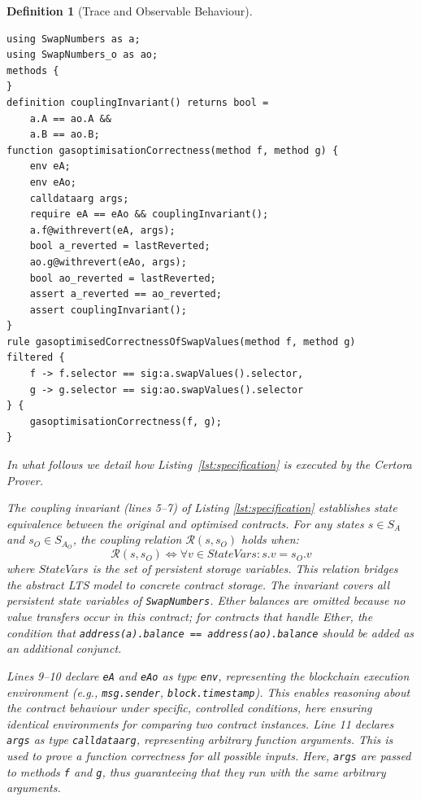 \documentclass[manuscript,screen,review]{acmart}
\newtheorem{definition}{Definition}
\begin{document}
\begin{definition}[Trace and Observable Behaviour]
\begin{listing}[htb]
\begin{scriptsize}
\begin{verbatim}
using SwapNumbers as a;
using SwapNumbers_o as ao;
methods {
}
definition couplingInvariant() returns bool =
    a.A == ao.A &&
    a.B == ao.B;
function gasoptimisationCorrectness(method f, method g) {
    env eA;
    env eAo;
    calldataarg args;
    require eA == eAo && couplingInvariant();
    a.f@withrevert(eA, args);
    bool a_reverted = lastReverted;
    ao.g@withrevert(eAo, args);
    bool ao_reverted = lastReverted;
    assert a_reverted == ao_reverted;
    assert couplingInvariant();
}
rule gasoptimisedCorrectnessOfSwapValues(method f, method g)
filtered {
    f -> f.selector == sig:a.swapValues().selector,
    g -> g.selector == sig:ao.swapValues().selector
} {
    gasoptimisationCorrectness(f, g);
}
\end{verbatim}
\end{scriptsize}
\caption{An example of a CVL specification.}
\label{lst:specification}
\end{listing}

In what follows we detail how Listing~\ref{lst:specification} is executed by the Certora Prover.

The coupling invariant (lines 5--7) of Listing \ref{lst:specification} establishes state equivalence between the original and optimised contracts. For any states $s \in S_A$ and $s_O \in S_{A_O}$, the coupling relation $\mathcal{R}(s, s_O)$ holds when:
\[\mathcal{R}(s, s_O) \iff \forall v \in \textit{StateVars}: s.v = s_O.v\]
where $\textit{StateVars}$ is the set of persistent storage variables. This relation bridges the abstract LTS model to concrete contract storage. The invariant covers all persistent state variables of \texttt{SwapNumbers}. Ether balances are omitted because no value transfers occur in
this contract; for contracts that handle Ether, the condition that
\texttt{address(a).balance == address(ao).balance} should be added as an
additional conjunct.

Lines 9--10 declare \texttt{eA} and \texttt{eAo} as type \texttt{env}, representing the blockchain execution environment (e.g., \texttt{msg.sender}, \texttt{block.timestamp}). This enables reasoning about the contract behaviour under specific, controlled conditions, here ensuring identical environments for comparing two contract instances. Line 11 declares \texttt{args} as type \texttt{calldataarg}, representing arbitrary function arguments. This is used to prove a function correctness for all possible inputs. Here, \texttt{args} are passed to methods \texttt{f} and \texttt{g}, thus guaranteeing that they run with the same arbitrary arguments.


\end{definition}
\end{document}
